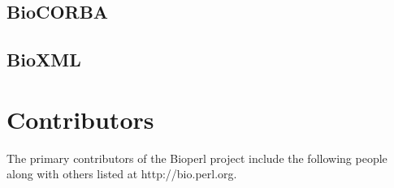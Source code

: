 \documentclass{article}
\begin{document}
\begin{twocolumn}
\subsection{BioCORBA}

\subsection{BioXML}

\section{Contributors}

The primary contributors of the Bioperl project include the following
people along with others listed at http://bio.perl.org.



\end{twocolumn}
\end{document}
